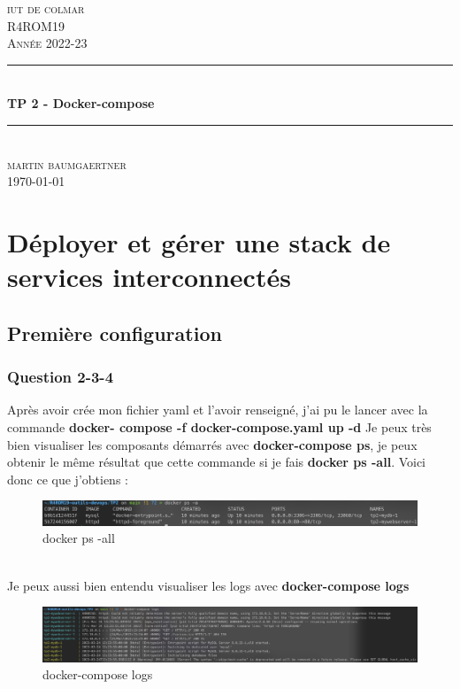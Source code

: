 \documentclass[12pt, a4paper]{article}
\begin{document}
\begin{titlepage}
	\newcommand{\HRule}{\rule{\linewidth}{0.5mm}} 
	\center 
	\textsc{\LARGE iut de colmar}\\[6.5cm] 
	\textsc{\Large R4ROM19}\\[0.5cm] 
	\textsc{\large Année 2022-23}\\[0.5cm]
	\HRule\\[0.75cm]
	{\huge\bfseries TP 2 - Docker-compose}\\[0.4cm]
	\HRule\\[1.5cm]
	\textsc{\large martin baumgaertner}\\[6.5cm] 

	\vfill\vfill\vfill
	{\large\today} 
	\vfill
\end{titlepage}
\newpage
\tableofcontents
\newpage
\section{Déployer et gérer une stack de services interconnectés}
\subsection{Première configuration}
\subsubsection{Question 2-3-4}
Après avoir crée mon fichier yaml et l'avoir renseigné,
j'ai pu le lancer avec la commande \textbf{docker- compose -f docker-compose.yaml up -d}
Je peux très bien visualiser les composants démarrés avec \textbf{docker-compose ps}, 
je peux obtenir le même résultat que cette commande si je fais \textbf{docker ps -all}.
Voici donc ce que j'obtiens : 
\begin{figure}[h]
    \centering
    \includegraphics[width=1\textwidth]{img/ps-a.png}
    \caption{docker ps -all}
    \label{fig:ps-a}
\end{figure}\\

Je peux aussi bien entendu visualiser les logs avec \textbf{docker-compose logs}
\begin{figure}[h]
    \centering
    \includegraphics[width=1\textwidth]{img/logs.png}
    \caption{docker-compose logs}
    \label{fig:logs}
\end{figure}\\
\end{document}
